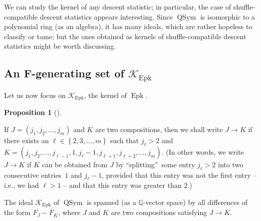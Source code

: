 \documentclass[numbers=enddot,12pt,final,onecolumn,notitlepage]{scrartcl}%
\theoremstyle{definition}
\newtheorem{prop}[theo]{Proposition}
\newenvironment{proposition}[1][]
{\begin{prop}[#1]\begin{leftbar}}
{\end{leftbar}\end{prop}}
\begin{document}
We can study the kernel of any descent statistic; in particular, the case of
shuffle-compatible descent statistics appears interesting. Since
$\operatorname*{QSym}$ is isomorphic to a polynomial ring (as an algebra), it
has many ideals, which are rather hopeless to classify or tame; but the ones
obtained as kernels of shuffle-compatible descent statistics might be worth discussing.

\subsection{An F-generating set of $\mathcal{K}_{\operatorname{Epk}}$}

Let us now focus on $\mathcal{K}_{\operatorname{Epk}}$, the kernel of
$\operatorname{Epk}$.

\begin{proposition}
\label{prop.K.Epk.F}If $J=\left(  j_{1},j_{2},\ldots,j_{m}\right)  $ and $K$
are two compositions, then we shall write $J\rightarrow K$ if there exists an
$\ell\in\left\{  2,3,\ldots,m\right\}  $ such that $j_{\ell}>2$ and $K=\left(
j_{1},j_{2},\ldots,j_{\ell-1},1,j_{\ell}-1,j_{\ell+1},j_{\ell+2},\ldots
,j_{m}\right)  $. (In other words, we write $J\rightarrow K$ if $K$ can be
obtained from $J$ by \textquotedblleft splitting\textquotedblright\ some entry
$j_{\ell}>2$ into two consecutive entries\footnotemark\ $1$ and $j_{\ell}-1$,
provided that this entry was not the first entry -- i.e., we had $\ell>1$ --
and that this entry was greater than $2$.)

The ideal $\mathcal{K}_{\operatorname{Epk}}$ of $\operatorname*{QSym}$ is
spanned (as a $\mathbb{Q}$-vector space) by all differences of the form
$F_{J}-F_{K}$, where $J$ and $K$ are two compositions satisfying $J\rightarrow
K$.
\end{proposition}

\end{document}
